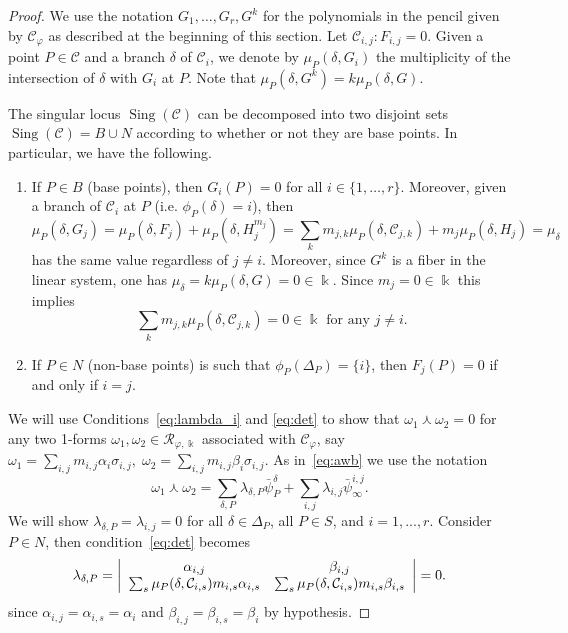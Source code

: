 \documentclass[10pt,a4paper]{amsart}
\DeclareMathOperator{\Sing}{Sing}
\def\cC{\mathcal{C}}
\def\cR{{\mathcal R}}
\def\kk{\Bbbk}
\def\w{\omega}
\begin{document}
\begin{proof}
We use the notation $G_1, \ldots ,G_r,G^k$ for the polynomials in the pencil given by $\cC_\varphi$ as described at the beginning of this section. Let $\cC_{i,j}: F_{i,j}=0$. 
Given a point $P\in \cC$ and a branch $\delta$ of $\cC_i$, we denote by $\mu_P(\delta,G_i)$ the multiplicity of the intersection of $\delta$ with $G_i$ at $P$. Note that 
$\mu_P(\delta,G^k)=k\mu_P(\delta,G)$.

The singular locus $\Sing(\cC)$ can be decomposed into two disjoint sets $\Sing(\cC)=B\cup N$ according to whether or not they are base points. In particular, we have the following.
\begin{enumerate}
\item \label{item:base}
If $P\in B$ (base points), then $G_i(P)=0$ for all $i \in \{1, \ldots ,r\}$. Moreover, given a branch of $\cC_i$ at $P$ (i.e. $\phi_P(\delta)=i$), then 
\begin{equation} \label{eq:mu_delta}
\mu_P(\delta,G_j)=
\mu_P(\delta,F_j)+\mu_P(\delta,H_j^{m_j})=
\sum_k m_{j,k}\mu_P(\delta,\cC_{j,k})+m_j\mu_P(\delta,H_j)=\mu_\delta
\end{equation}
has the same value regardless of $j\neq i$. Moreover, since $G^k$ is a fiber in the linear system, one has $\mu_\delta=k\mu_P(\delta,G)=0\in\kk$. Since $m_j=0\in\kk$ this implies 
\begin{equation}\label{eq:quasift}
\sum_k m_{j,k}\mu_P(\delta,\cC_{j,k})=0\in\kk \textrm{ for any } j\neq i.
\end{equation}
\item \label{item:nonbase}
If $P\in N$ (non-base points) is such that $\phi_P(\Delta_P)=\{i\}$, then $F_j(P)=0$ if and only if $i=j$.
\end{enumerate}
We will use Conditions~\eqref{eq:lambda_i} and \eqref{eq:det} 
to show that $\w_1\curlywedge \w_2=0$ for any two 1-forms $\w_1,\w_2\in \cR_{\varphi,\kk}$ associated with $\cC_\varphi$, say $\w_1 = \sum_{i,j} m_{i,j}\alpha_{i}\sigma_{i,j}, \; \w_2 = \sum_{i,j} m_{i,j}\beta_{i}\sigma_{i,j}$. 
As in~\eqref{eq:awb} we use the notation 
$$
\w_1\curlywedge\w_2=
\sum_{\delta,P}\lambda_{\delta,P} \bar\psi_{P}^\delta+
\sum_{i,j} \lambda_{i,j}\bar\psi_\infty^{i,j}.
$$
We will show $\lambda_{\delta,P}=\lambda_{i,j}=0$ for all $\delta\in\Delta_P$, all $P\in S$, and $i=1,...,r$.
Consider $P\in N$, then 
condition~\eqref{eq:det} becomes
\begin{equation} \label{eq:non_base_P}
\lambda_{\delta,P}=    
\left|
\array{cc}
\alpha_{i,j} & \beta_{i,j}\\
\sum_s \mu_P(\delta,\cC_{i,s})m_{i,s}\alpha_{i,s} & \sum_s \mu_P(\delta,\cC_{i,s})m_{i,s}\beta_{i,s}\\
\endarray
\right|=0.
\end{equation}
since $\alpha_{i,j}=\alpha_{i,s}=\alpha_i$
and 
$\beta_{i,j}=\beta_{i,s}=\beta_i$ by hypothesis.


\end{proof}
\end{document}
